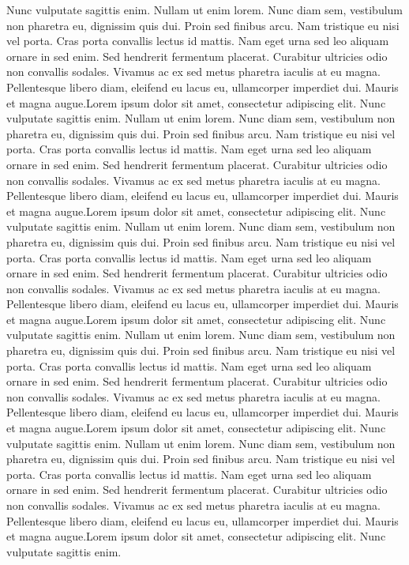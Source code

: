 \documentclass[twoside]{book}
\begin{document}
    Nunc vulputate sagittis enim. Nullam ut enim lorem. Nunc diam sem, vestibulum non pharetra eu, dignissim quis dui. Proin sed finibus arcu. Nam tristique eu nisi vel porta. Cras porta convallis lectus id mattis. Nam eget urna sed leo aliquam ornare in sed enim. Sed hendrerit fermentum placerat. Curabitur ultricies odio non convallis sodales. Vivamus ac ex sed metus pharetra iaculis at eu magna. Pellentesque libero diam, eleifend eu lacus eu, ullamcorper imperdiet dui. Mauris et magna augue.Lorem ipsum dolor sit amet, consectetur adipiscing elit. Nunc vulputate sagittis enim. Nullam ut enim lorem. Nunc diam sem, vestibulum non pharetra eu, dignissim quis dui. Proin sed finibus arcu. Nam tristique eu nisi vel porta. Cras porta convallis lectus id mattis. Nam eget urna sed leo aliquam ornare in sed enim. Sed hendrerit fermentum placerat. Curabitur ultricies odio non convallis sodales. Vivamus ac ex sed metus pharetra iaculis at eu magna. Pellentesque libero diam, eleifend eu lacus eu, ullamcorper imperdiet dui. Mauris et magna augue.Lorem ipsum dolor sit amet, consectetur adipiscing elit. Nunc vulputate sagittis enim. Nullam ut enim lorem. Nunc diam sem, vestibulum non pharetra eu, dignissim quis dui. Proin sed finibus arcu. Nam tristique eu nisi vel porta. Cras porta convallis lectus id mattis. Nam eget urna sed leo aliquam ornare in sed enim. Sed hendrerit fermentum placerat. Curabitur ultricies odio non convallis sodales. Vivamus ac ex sed metus pharetra iaculis at eu magna. Pellentesque libero diam, eleifend eu lacus eu, ullamcorper imperdiet dui. Mauris et magna augue.Lorem ipsum dolor sit amet, consectetur adipiscing elit. Nunc vulputate sagittis enim. Nullam ut enim lorem. Nunc diam sem, vestibulum non pharetra eu, dignissim quis dui. Proin sed finibus arcu. Nam tristique eu nisi vel porta. Cras porta convallis lectus id mattis. Nam eget urna sed leo aliquam ornare in sed enim. Sed hendrerit fermentum placerat. Curabitur ultricies odio non convallis sodales. Vivamus ac ex sed metus pharetra iaculis at eu magna. Pellentesque libero diam, eleifend eu lacus eu, ullamcorper imperdiet dui. Mauris et magna augue.Lorem ipsum dolor sit amet, consectetur adipiscing elit. Nunc vulputate sagittis enim. Nullam ut enim lorem. Nunc diam sem, vestibulum non pharetra eu, dignissim quis dui. Proin sed finibus arcu. Nam tristique eu nisi vel porta. Cras porta convallis lectus id mattis. Nam eget urna sed leo aliquam ornare in sed enim. Sed hendrerit fermentum placerat. Curabitur ultricies odio non convallis sodales. Vivamus ac ex sed metus pharetra iaculis at eu magna. Pellentesque libero diam, eleifend eu lacus eu, ullamcorper imperdiet dui. Mauris et magna augue.Lorem ipsum dolor sit amet, consectetur adipiscing elit. Nunc vulputate sagittis enim. 
\end{document}
